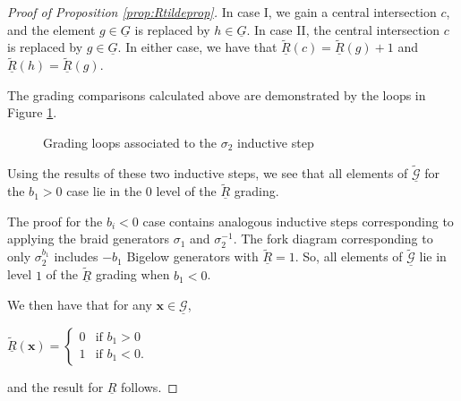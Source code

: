 \documentclass[11pt]{article}
\theoremstyle{plain} \newtheorem{thm}{Theorem}[subsection]
\theoremstyle{plain} \newtheorem{cor}[thm]{Corollary}
\theoremstyle{plain} \newtheorem{prop}[thm]{Proposition}
\theoremstyle{plain} \newtheorem{conj}[thm]{Conjecture}
\theoremstyle{plain} \newtheorem{lem}[thm]{Lemma}
\theoremstyle{definition} \newtheorem{df}[thm]{Definition}
\theoremstyle{remark} \newtheorem{rmk}[thm]{Remark}
\theoremstyle{remark} \newtheorem{obs}[thm]{Observation}
\newcommand{\G}{\mathcal{G}}
\newcommand{\Gtr}{\underline{G}}
\newcommand{\tld}[1]{\widetilde{#1}}
\newcommand{\Gtil}{\tld{\mathcal{G}}}
\newcommand{\red}[1]{\underline{#1}}
\newcommand{\bx}{\mathbf{x}}
\numberwithin{equation}{section}
\begin{document}
\begin{proof}[Proof of Proposition \ref{prop:Rtildeprop}]
In case I, we gain a central intersection $c$, and the element $g \in \Gtr$ is replaced by $h \in \Gtr$.  In case II, the central intersection $c$ is replaced by $g \in \Gtr$.  In either case, we have that $\red{\tld{R}}(c) = \red{\tld{R}}(g)+1$ and $\red{\tld{R}}(h) = \red{\tld{R}}(g)$.

The grading comparisons calculated above are demonstrated by the loops in Figure \ref{fig:sigma2loops}.

\begin{figure}[h]
\centering
{}\quad
{}
\caption[Grading loops associated to the $\sigma_{2}$ inductive step in the proof of Proposition \ref{prop:Rtildeprop}]{Grading loops associated to the $\sigma_{2}$ inductive step}
\label{fig:sigma2loops}
\end{figure}
Using the results of these two inductive steps, we see that all elements of $\red{\Gtil}$ for the $b_{1} > 0$ case lie in the $0$ level of the $\red{\tld{R}}$ grading.

The proof for the $b_{i} < 0$ case contains analogous inductive steps corresponding to applying the braid generators $\sigma_{1}$ and $\sigma_{2}^{-1}$.  The fork diagram corresponding to only $\sigma_{2}^{b_{1}}$ includes $-b_{1}$ Bigelow generators with $\red{\tld{R}} = 1$.  So, all elements of $\red{\Gtil}$ lie in level $1$ of the $\red{\tld{R}}$ grading when $b_{1} < 0$.

We then have that for any $\bx \in \red{\G}$,
\begin{center}
$\red{\tld{R}}(\bx) =
 \begin{cases} 
0& \text{if $b_{1} > 0$}\\ 
1& \text{if $b_{1} < 0$}.
\end{cases}$
\end{center}
and the result for $\red{R}$ follows.
\end{proof}
\end{document}
